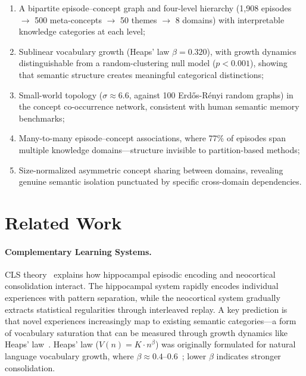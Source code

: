\documentclass{svproc}
\begin{document}
\begin{enumerate}
    \item A bipartite episode--concept graph and four-level hierarchy
          (1,908 episodes $\to$ 500 meta-concepts $\to$ 50 themes $\to$
          8 domains) with interpretable knowledge categories at each level;
    \item Sublinear vocabulary growth (Heaps' law $\beta = 0.320$),
          with growth dynamics distinguishable from a random-clustering null
          model ($p < 0.001$), showing that semantic structure creates
          meaningful categorical distinctions;
    \item Small-world topology ($\sigma \approx 6.6$, against 100 Erd\H{o}s-R\'{e}nyi
          random graphs) in the concept co-occurrence network, consistent with
          human semantic memory benchmarks;
    \item Many-to-many episode--concept associations, where 77\% of episodes span
          multiple knowledge domains---structure invisible to partition-based methods;
    \item Size-normalized asymmetric concept sharing between domains, revealing
          genuine semantic isolation punctuated by specific cross-domain dependencies.
\end{enumerate}

\section{Related Work}
\label{sec:related}

\paragraph{Complementary Learning Systems.}
CLS theory~\cite{mcclelland1995there,kumaran2016learning} explains how hippocampal
episodic encoding and neocortical consolidation interact. The hippocampal system
rapidly encodes individual experiences with pattern separation, while the
neocortical system gradually extracts statistical regularities through
interleaved replay. A key prediction is that novel experiences increasingly
map to existing semantic categories---a form of vocabulary saturation that
can be measured through growth dynamics like Heaps'
law~\cite{heaps1978information}. Heaps' law ($V(n) = K \cdot n^\beta$)
was originally formulated for natural language vocabulary growth,
where $\beta \approx 0.4$--$0.6$~\cite{lti2009heaps}; lower $\beta$ indicates
stronger consolidation.
\end{document}
